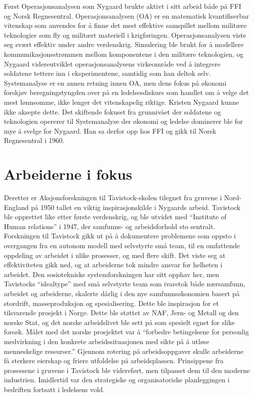 Først Operasjonsanalysen som Nygaard brukte aktivt i sitt arbeid både på FFI og Norsk Regnesentral. Operasjonsanalysen (OA) er en matematisk kvantifiserbar vitenskap som anvendes for å finne det mest effektive samspillet mellom militære teknologier som fly og militært materiell i krigføringen. Operasjonsanalysen viste seg svært effektiv under andre verdenskrig. Simulering ble brukt for å modellere kommunikasjonsstrømmen mellom komponentene i den militære teknologien, og Nygaard videreutviklet operasjonsanalysens virkeområde ved å integrere soldatene tettere inn i eksperimentene, samtidig som han deltok selv. Systemanalyse er en annen retning innen OA, men dens fokus på økonomi forskjøv beregningstyngden over på en ledelsesdiskurs som handlet om å velge det mest lønnsomme, ikke lenger det vitenskapelig riktige. Kristen Nygaard kunne ikke aksepte dette. Det skiftende fokuset fra grunnivået der soldatene og teknologien opererer til Systemanalyse der økonomi og ledelse dominerer ble for mye å svelge for Nygaard. Han sa derfor opp hos FFI og gikk til Norsk Regnesentral i 1960.

\section{Arbeiderne i fokus}

Deretter er Aksjonsforskningen til Tavistock-skolen tilegnet fra gruvene i Nord-England på 1950 tallet en viktig inspirasjonskilde i Nygaards arbeid. Tavistock ble opprettet like etter første verdenskrig, og ble utvidet med ``Institute of Human relations'' i 1947, der samfunns- og arbeidsforhold sto sentralt. Forskningen til Tavistock gikk ut på å dokumentere problemene som oppsto i overgangen fra en autonom modell med selvstyrte små team, til en omfattende oppdeling av arbeidet i ulike prosesser, og med flere skift. Det viste seg at effektiviteten gikk ned, og at arbeiderne tok mindre ansvar for helheten i arbeidet. Den sosiotekniske systemforskningen har sitt opphav her, men Tavistocks ``idealtype'' med små selvstyrte team som ivaretok både nærsamfunn, arbeidet og arbeiderne, skalerte dårlig i den nye samfunnsøkonomien basert på stordrift, masseproduksjon og spesialisering. Dette ble inspirasjon for et tilsvarende prosjekt i Norge. Dette ble støttet av NAF, Jern- og Metall og den norske Stat, og det norske arbeidslivet ble sett på som spesielt egnet for slike forsøk. Målet med det norske prosjektet var å ``forbedre betingelsene for personlig medvirkning i den konkrete arbeidssituasjonen med sikte på å utløse menneskelige ressurser.'' Gjennom rotering på arbeidsoppgaver skulle arbeiderne få sterkere eierskap og friere utfoldelse på arbeidsplassen. Prinsippene fra prosessene i gruvene i Tavistock ble videreført, men tilpasset dem til den moderne industrien. Imidlertid var den strategiske og organisatoriske planleggingen i bedriften fortsatt i ledelsens vold.

